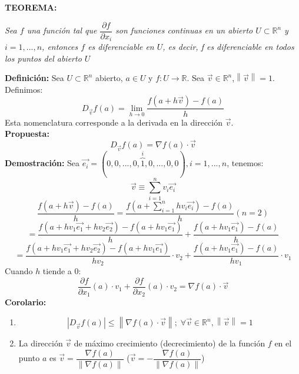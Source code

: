 \documentclass[11pt]{article}
\providecommand{\norm}[1]{\left\lVert #1 \right \rVert}
\providecommand{\abs}[1]{\left\lvert #1\right\rvert}
\providecommand{\norm}[1]{\left\lVert #1 \right \rVert}
\providecommand{\abs}[1]{\left\lvert #1\right\rvert}
\newcommand{\R}{\mathbb{R}}
\theoremstyle{plain}
\begin{document}
        \textbf{TEOREMA:}
        \begin{center}
            \textit{Sea $f$ una función tal que $\dfrac{\partial f}{\partial x_i}$ son funciones continuas en un abierto $U \subset \R^n$ y $i=1,...,n$, entonces $f$ es diferenciable en $U$, es decir, f es diferenciable en todos los puntos del abierto $U$}
        \end{center}
        \textbf{Definición:} Sea $U \subset \R^n$ abierto, $a \in U$ y $f:U\rightarrow \R$. Sea $\vec{v}\in\R^n$,$\norm{\vec{v}} = 1$. Definimos:
        \begin{equation}
            D_{\vec{v}} f(a)= \lim_{h\to 0} \frac{f(a +h\vec{v}) -f(a)}{h}
        \end{equation} 
        Esta nomenclatura corresponde a la derivada en la dirección $\vec{v}$.\\

        \textbf{Propuesta:} \[D_{\vec{v}} f(a) = \nabla f(a) \cdot \vec{v}\]
        \textbf{Demostración:} Sea $\vec{e_i} = (0,0,...,0,\overbrace{1}^{i},0,...,0,0), i=1,...,n$, tenemos:
        \[\vec{v}\equiv \sum_{i=1}^{n} v_i \vec{e_i}\]
        \[ \frac{f(a +h\vec{v}) -f(a)}{h} =  \frac{f(a +\sum_{i=1}^{n} hv_i \vec{e_i}) -f(a)}{h}(n=2)\]
        \[= \frac{f(a + hv_1\vec{e_1} +hv_2\vec{e_2}) - f(a + hv_1\vec{e_1})}{h} + \frac{f(a + hv_1\vec{e_1}) -f(a)}{h}\]
        \[= \frac{f(a + hv_1\vec{e_1} +hv_2\vec{e_2}) - f(a + hv_1\vec{e_1})}{hv_2}\cdot v_2 + \frac{f(a + hv_1\vec{e_1}) -f(a)}{hv_1}\cdot v_1\]
        Cuando $h$ tiende a $0$:
        \[\dfrac{\partial f}{\partial x_1}(a) \cdot v_1 + \dfrac{\partial f}{\partial x_2}(a)\cdot v_2 = \nabla f(a) \cdot \vec{v}\]
        \textbf{Corolario:}
        \begin{enumerate}[label= \Alph*]
            \item \[\abs{D_{\vec{v}} f(a)} \le \norm{\nabla f(a) \cdot \vec{v}} ;\; \forall \vec{v} \in \R^n, \norm{\vec{v}}=1\]
            \item La dirección $\vec{v}$ de máximo crecimiento (decrecimiento) de la función $f$ en el punto $a$ es $\vec{v} = \dfrac{\nabla f(a)}{\norm{\nabla f(a)}}$ ($\vec{v} = - \dfrac{\nabla f(a)}{\norm{\nabla f(a)}}$)
        \end{enumerate}
\end{document}
